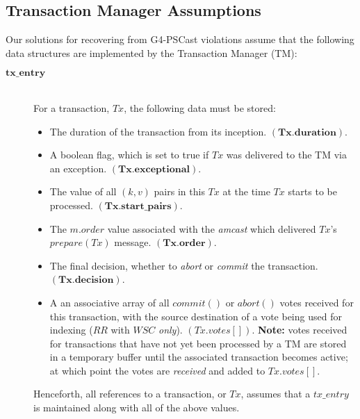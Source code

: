     \subsection{Transaction Manager Assumptions}
    Our solutions for recovering from G4-PSCast violations assume that the following data structures are implemented by the Transaction Manager (TM):
    
    \begin{description}
        \item[$\bm{tx\_entry}$] \hfill \\
        For a transaction, $Tx$, the following data must be stored:
            \begin{itemize}
                \item    The duration of the transaction from its inception. $(\bm{Tx.duration})$.            
            
                \item    A boolean flag, which is set to true if $Tx$ was delivered to the TM via an exception.  $(\bm{Tx.exceptional})$.
            
                \item    The value of all $(k,v)$ pairs in this $Tx$ at the time $Tx$ starts to be processed. $(\bm{Tx.start\_pairs})$.
                
                \item    The $m.order$ value associated with the \emph{amcast} which delivered $Tx$'s $prepare(Tx)$ message.  $(\bm{Tx.order})$.
                
                \item    The final decision, whether to \emph{abort} or \emph{commit} the transaction. $(\bm{Tx.decision})$.
                
                \item    A an associative array of all $commit()$ or $abort()$ votes received for this transaction, with the source destination of a vote being used for indexing ($RR$ with $WSC$ \emph{only}).  $(Tx.votes[])$. \textbf{Note:} votes received for transactions that have not yet been processed by a TM are stored in a temporary buffer until the associated transaction becomes active; at which point the votes are \emph{received} and added to $Tx.votes[]$.  
            \end{itemize}
            
        Henceforth, all references to a transaction, or $Tx$, assumes that a $tx\_entry$ is maintained along with all of the above values.  
            

\end{description}
